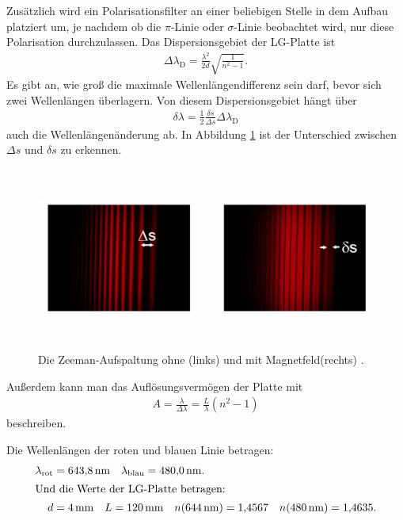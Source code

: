 Zusätzlich wird ein Polarisationsfilter an einer beliebigen Stelle in dem Aufbau platziert um, je nachdem ob die $\pi$-Linie oder $\sigma$-Linie beobachtet wird, nur diese Polarisation durchzulassen.
Das Dispersionsgebiet
der LG-Platte ist
\begin{align}
  \Delta \lambda_\text{D} = \frac{\lambda^2}{2 d} \sqrt{\frac{1}{n^2-1}}.
\end{align}
Es gibt an, wie groß die maximale Wellenlängendifferenz sein darf, bevor sich zwei Wellenlängen überlagern.
Von diesem Dispersionsgebiet hängt über
\begin{align}
  \delta \lambda = \frac{1}{2}\frac{\delta s}{\Delta s} \Delta \lambda_\text{D} \label{eqn:aenderungLambda}
\end{align}
auch die Wellenlängenänderung ab. In Abbildung \ref{fig:deltasDeltas} ist der Unterschied zwischen $\Delta s$ und $\delta s$ zu erkennen.
\begin{figure}
  \centering
  \includegraphics[height=6cm]{besuchInDerNacktmullAufzuchtstation/deltasDeltas.pdf}
  \caption{Die Zeeman-Aufspaltung ohne (links) und mit Magnetfeld(rechts) \cite{anleitung}.}
  \label{fig:deltasDeltas}
\end{figure}

Außerdem kann man das Auflösungsvermögen der Platte mit
\begin{align}
  A = \frac{\lambda}{\Delta \lambda} = \frac{L}{\lambda} (n^2 - 1)
\end{align}
beschreiben.

Die Wellenlängen der roten und blauen Linie betragen:
\begin{align*}
  \lambda_\text{rot} &= \SI{643.8}{\nano\meter} \quad \lambda_\text{blau} = \SI{480.0}{\nano\meter}.\\
\intertext{Und die Werte der LG-Platte betragen:}
  d &= \SI{4}{\milli\meter} \quad L = \SI{120}{\milli\meter} \quad n(\SI{644}{\nano\meter}) = \num{1.4567} \quad n(\SI{480}{\nano\meter}) = \num{1.4635}.
\end{align*}

